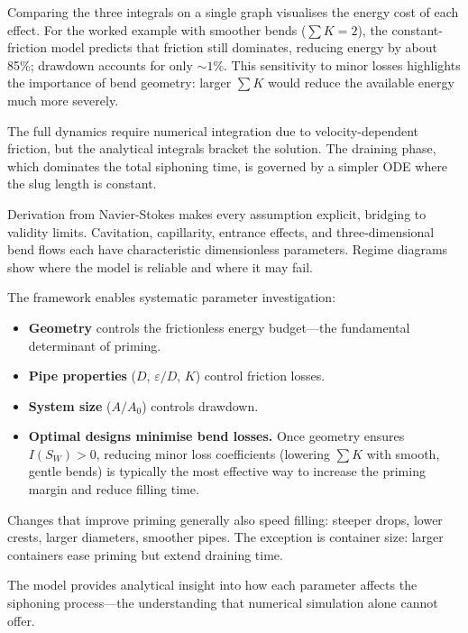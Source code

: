 \documentclass[11pt]{article}
\begin{document}
Comparing the three integrals on a single graph visualises the energy cost of each effect. For the worked example with smoother bends ($\sum K = 2$), the constant-friction model predicts that friction still dominates, reducing energy by about 85\%; drawdown accounts for only $\sim 1\%$. This sensitivity to minor losses highlights the importance of bend geometry: larger $\sum K$ would reduce the available energy much more severely.

The full dynamics require numerical integration due to velocity-dependent friction, but the analytical integrals bracket the solution. The draining phase, which dominates the total siphoning time, is governed by a simpler ODE where the slug length is constant.

Derivation from Navier-Stokes makes every assumption explicit, bridging to validity limits. Cavitation, capillarity, entrance effects, and three-dimensional bend flows each have characteristic dimensionless parameters. Regime diagrams show where the model is reliable and where it may fail.

The framework enables systematic parameter investigation:
\begin{itemize}[nosep,leftmargin=2em]
  \item \textbf{Geometry} controls the frictionless energy budget---the fundamental determinant of priming.
  \item \textbf{Pipe properties} ($D$, $\varepsilon/D$, $K$) control friction losses.
  \item \textbf{System size} ($A/A_0$) controls drawdown.
  \item \textbf{Optimal designs minimise bend losses.} Once geometry ensures $I(S_W) > 0$, reducing minor loss coefficients (lowering $\sum K$ with smooth, gentle bends) is typically the most effective way to increase the priming margin and reduce filling time.
\end{itemize}

Changes that improve priming generally also speed filling: steeper drops, lower crests, larger diameters, smoother pipes. The exception is container size: larger containers ease priming but extend draining time.

The model provides analytical insight into how each parameter affects the siphoning process---the understanding that numerical simulation alone cannot offer.

\appendix
\end{document}
